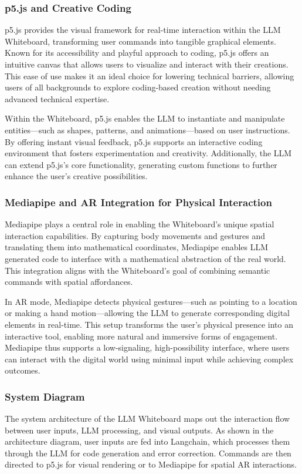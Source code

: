 \subsubsection{p5.js and Creative Coding}
p5.js provides the visual framework for real-time interaction within the LLM Whiteboard, transforming user commands into tangible graphical elements.
Known for its accessibility and playful approach to coding, p5.js offers an intuitive canvas that allows users to visualize and interact with their creations.
This ease of use makes it an ideal choice for lowering technical barriers, allowing users of all backgrounds to explore coding-based creation without needing advanced technical expertise.

Within the Whiteboard, p5.js enables the LLM to instantiate and manipulate entities—such as shapes, patterns, and animations—based on user instructions.
By offering instant visual feedback, p5.js supports an interactive coding environment that fosters experimentation and creativity.
Additionally, the LLM can extend p5.js’s core functionality, generating custom functions to further enhance the user’s creative possibilities.

\subsubsection{Mediapipe and AR Integration for Physical Interaction}
Mediapipe plays a central role in enabling the Whiteboard’s unique spatial interaction capabilities.
By capturing body movements and gestures and translating them into mathematical coordinates, Mediapipe enables LLM generated code to interface with a mathematical abstraction of the real world.
This integration aligns with the Whiteboard’s goal of combining semantic commands with spatial affordances.

In AR mode, Mediapipe detects physical gestures—such as pointing to a location or making a hand motion—allowing the LLM to generate corresponding digital elements in real-time.
This setup transforms the user’s physical presence into an interactive tool, enabling more natural and immersive forms of engagement.
Mediapipe thus supports a low-signaling, high-possibility interface, where users can interact with the digital world using minimal input while achieving complex outcomes.

\subsubsection{System Diagram}
The system architecture of the LLM Whiteboard maps out the interaction flow between user inputs, LLM processing, and visual outputs.
As shown in the architecture diagram, user inputs are fed into Langchain, which processes them through the LLM for code generation and error correction.
Commands are then directed to p5.js for visual rendering or to Mediapipe for spatial AR interactions.

